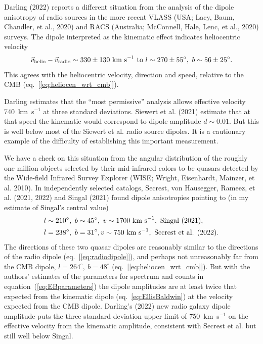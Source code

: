 \documentclass[fleqn,usenatbib]{mnras}
\newcommand{\beq}{\begin{equation}}
\newcommand{\eeq}{\end{equation}}
\begin{document}
Darling (2022) reports a different situation from the analysis of the dipole anisotropy of radio sources in the more recent VLASS (USA; Lacy, Baum, Chandler, et al., 2020) and RACS (Australia; McConnell, Hale, Lenc, et al., 2020) surveys. The dipole interpreted as the kinematic effect indicates heliocentric velocity
\beq
{\vec v}_{\rm helio} - {\vec v}_{\rm radio}  \sim 330\pm 130\hbox{ km s}^{-1}\hbox{ to } l \sim 270\pm 55^\circ,\ b \sim 56\pm 25^\circ.\label{eq:Darling}
\eeq
This agrees with the heliocentric velocity, direction and speed, relative to the CMB (eq.~[\ref{eq:heliocen_wrt_cmb}]).

Darling estimates that the ``most permissive'' analysis allows effective velocity 740~km~s$^{-1}$ at three standard deviations. Siewert et al. (2021) estimate that at that speed the kinematic would correspond to dipole amplitude $d\sim 0.01$. But this is well below most of the Siewert et al. radio source dipoles. It is a cautionary example of  the difficulty of establishing this important measurement. 

We have a check on this  situation from the angular distribution of the roughly one million objects selected by their mid-infrared colors to be quasars detected by the Wide-field Infrared Survey Explorer (WISE; Wright, Eisenhardt, Mainzer, et al. 2010). In independently selected catalogs, Secrest, von Hausegger, Rameez, et al. (2021, 2022) and Singal (2021) found dipole anisotropies pointing to (in my estimate of Singal's central value) 
\begin{align}
& l\sim 210^\circ,\ b\sim 45^\circ,\ v\sim 1700\hbox{ km s}^{-1},\hbox{ Singal (2021)},\nonumber\\
&l= 238^\circ,\ b=31^\circ, v \sim 750\hbox{ km s}^{-1},\hbox{ Secrest et al. (2022)}. \label{eq:kinematicdipole}
\end{align}
The directions of these two quasar dipoles are reasonably similar to the directions of the radio dipole (eq.~[\ref{eq:radiodipole}]), and perhaps not unreasonably far from the CMB dipole,  $l = 264^\circ,\ b=48^\circ$ (eq.~[\ref{eq:heliocen_wrt_cmb}]). But with the authors' estimates of the parameters for spectrum and counts in equation~(\ref{eq:EBparameters}) the dipole amplitudes are at least twice that expected from the kinematic dipole (eq.~\ref{eq:EllisBaldwin}) at the velocity expected from the CMB dipole. Darling's (2022) new radio galaxy dipole amplitude puts the three standard deviation upper limit of 750~km~s$^{-1}$ on the effective velocity from the kinematic amplitude, consistent with Secrest et al. but still well below Singal. 
\end{document}

